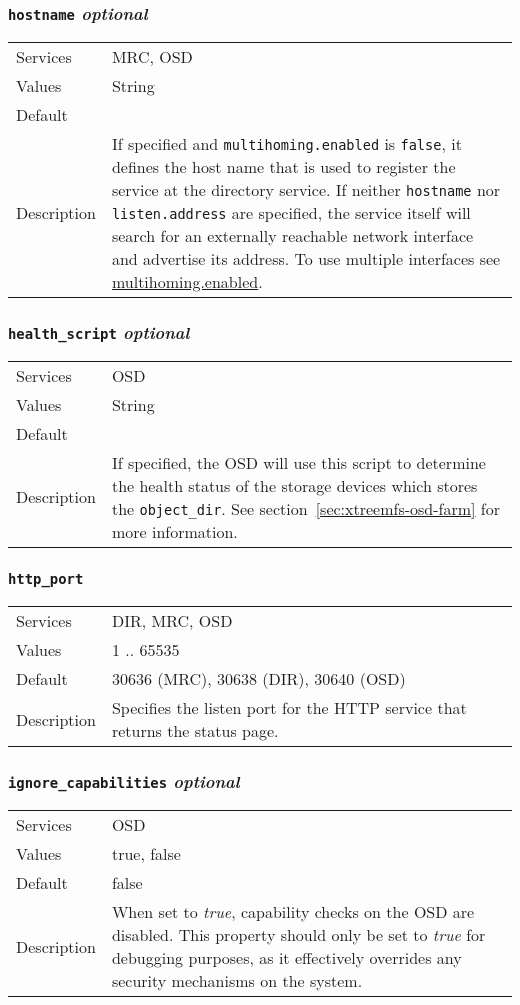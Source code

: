 \documentclass[a4paper,10pt]{book}
\begin{document}
\subsubsection{\texttt{hostname} \textit{optional}}
\label{options:hostname}
\begin{tabular}{lp{10cm}}
 Services & MRC, OSD\\
 Values   & String \\
 Default  & \\
 Description & If specified and \texttt{multihoming.enabled} is \texttt{false}, it defines the host name that is used to register the service at the directory service. If neither \texttt{hostname} nor \texttt{listen.address} are specified, the service itself will search for an externally reachable network interface and advertise its address. To use multiple interfaces see \hyperref[option:multihoming.enabled]{multihoming.enabled}.
\end{tabular}

\subsubsection{\texttt{health\_script} \textit{optional}}
\begin{tabular}{lp{10cm}}
 Services & OSD\\
 Values   & String \\
 Default  & \\
 Description & If specified, the OSD will use this script to determine the health status of the storage devices which stores the \texttt{object\_dir}. See section~\ref{sec:xtreemfs-osd-farm} for more information.
\end{tabular}
\subsubsection{\texttt{http\_port}}
\begin{tabular}{lp{10cm}}
 Services & DIR, MRC, OSD\\
 Values   & 1 .. 65535 \\
 Default  & 30636 (MRC), 30638 (DIR), 30640 (OSD)\\
 Description & Specifies the listen port for the HTTP service that returns the status page.
\end{tabular}

\subsubsection{\texttt{ignore\_capabilities} \textit{optional}}
\begin{tabular}{lp{10cm}}
 Services & OSD\\
 Values   & true, false \\
 Default  & false\\
 Description & When set to \textit{true}, capability checks on the OSD are disabled. This property should only be set to \textit{true} for debugging purposes, as it effectively overrides any security mechanisms on the system.
\end{tabular}
\end{document}
